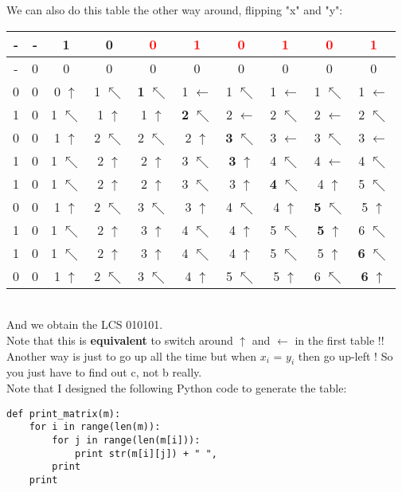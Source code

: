 \documentclass[11pt]{article}
\begin{document}
\begin{enumerate}
    \\\\ We can also do this table the other way around, flipping "x" and "y": \\
    \begin{tabular}{ c | c c c c c c c c c } 
        - & - & 1 & 0 & \textcolor{red}{0} & \textcolor{red}{1} & \textcolor{red}{0} & \textcolor{red}{1} & \textcolor{red}{0} & \textcolor{red}{1} \\
        \hline
        - & 0 & 0 & 0 & 0 & 0 & 0 & 0 & 0 & 0 \\
        0 & 0 & 0 $\uparrow$ & 1 $\nwarrow$ & \textbf{1} $\nwarrow$ & 1 $\leftarrow$ & 1 $\nwarrow$ & 1 $\leftarrow$ & 1 $\nwarrow$ & 1 $\leftarrow$ \\
        1 & 0 & 1 $\nwarrow$ & 1 $\uparrow$ & 1 $\uparrow$ & \textbf{2} $\nwarrow$ & 2 $\leftarrow$ & 2 $\nwarrow$ & 2 $\leftarrow$ & 2 $\nwarrow$ \\
        0 & 0 & 1 $\uparrow$ & 2 $\nwarrow$ & 2 $\nwarrow$ & 2 $\uparrow$ & \textbf{3} $\nwarrow$ & 3 $\leftarrow$ & 3 $\nwarrow$ & 3 $\leftarrow$ \\
        1 & 0 & 1 $\nwarrow$ & 2 $\uparrow$ & 2 $\uparrow$ & 3 $\nwarrow$ & \textbf{3} $\uparrow$ & 4 $\nwarrow$ & 4 $\leftarrow$ & 4 $\nwarrow$ \\
        1 & 0 & 1 $\nwarrow$ & 2 $\uparrow$ & 2 $\uparrow$ & 3 $\nwarrow$ & 3 $\uparrow$ & \textbf{4} $\nwarrow$ & 4 $\uparrow$ & 5 $\nwarrow$ \\
        0 & 0 & 1 $\uparrow$ & 2 $\nwarrow$ & 3 $\nwarrow$ & 3 $\uparrow$ & 4 $\nwarrow$ & 4 $\uparrow$ & \textbf{5} $\nwarrow$ & 5 $\uparrow$ \\
        1 & 0 & 1 $\nwarrow$ & 2 $\uparrow$ & 3 $\uparrow$ & 4 $\nwarrow$ & 4 $\uparrow$ & 5 $\nwarrow$ & \textbf{5} $\uparrow$ & 6 $\nwarrow$ \\
        1 & 0 & 1 $\nwarrow$ & 2 $\uparrow$ & 3 $\uparrow$ & 4 $\nwarrow$ & 4 $\uparrow$ & 5 $\nwarrow$ & 5 $\uparrow$ & \textbf{6} $\nwarrow$ \\
        0 & 0 & 1 $\uparrow$ & 2 $\nwarrow$ & 3 $\nwarrow$ & 4 $\uparrow$ & 5 $\nwarrow$ & 5 $\uparrow$ & 6 $\nwarrow$ & \textbf{6} $\uparrow$ \\
    \end{tabular}
    \\ And we obtain the LCS 010101. 
    \\ Note that this is \textbf{equivalent} to switch around $\uparrow$ and $\leftarrow$ in the first table !!
    \\ Another way is just to go up all the time but when $x_i$ = $y_i$ then go up-left ! So you just have to find out c, not b really.
    \\ Note that I designed the following Python code to generate the table:
    \begin{verbatim}
def print_matrix(m):
    for i in range(len(m)):
        for j in range(len(m[i])):
            print str(m[i][j]) + " ",
        print
    print
    

\end{verbatim}
\end{enumerate}
\end{document}
